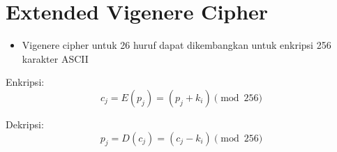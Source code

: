 \documentclass{article}
\begin{document}

\section*{Extended Vigenere Cipher}

\begin{itemize}
    \item Vigenere cipher untuk 26 huruf dapat dikembangkan untuk enkripsi 256 karakter ASCII
\end{itemize}

\vspace{10mm}

Enkripsi: \[ c_j = E(p_j) = (p_j + k_i) \pmod{256} \]

Dekripsi: \[ p_j = D(c_j) = (c_j - k_i) \pmod{256} \]
\end{document}
